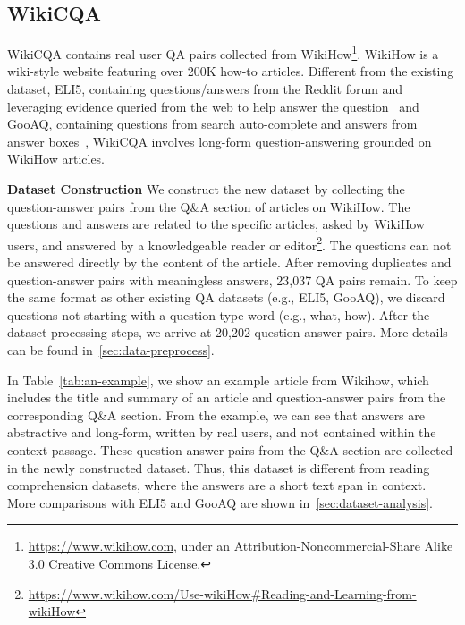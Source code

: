 \documentclass[11pt]{article}
\begin{document}
\subsection{WikiCQA}
\label{sec:dataset}

WikiCQA contains real user QA pairs collected from WikiHow\footnote{\url{https://www.wikihow.com}, under an Attribution-Noncommercial-Share Alike 3.0 Creative Commons License.}. WikiHow is a wiki-style website featuring over 200K how-to articles.  Different from the existing dataset, ELI5, containing questions/answers from the Reddit forum and leveraging evidence queried from the web to help answer the question~\cite{fan-etal-2019-eli5} and GooAQ, containing questions from search auto-complete and answers from answer boxes~\cite{khashabi-etal-2021-gooaq-open}, WikiCQA involves long-form question-answering grounded on WikiHow articles. 



\smallskip
\noindent \textbf{Dataset Construction} 
We construct the new dataset by collecting the question-answer pairs from the Q\&A section of articles on WikiHow.  
The questions and answers are related to the specific articles, asked by WikiHow users, and answered by a knowledgeable reader or editor\footnote{\url{https://www.wikihow.com/Use-wikiHow\#Reading-and-Learning-from-wikiHow}}. 
The questions can not be answered directly by the content of the article.
After removing duplicates and question-answer pairs with meaningless answers, 23,037 QA pairs remain. 
To keep the same format as other existing QA datasets (e.g., ELI5, GooAQ), we discard questions not starting with a question-type word (e.g., what, how). 
After the dataset processing steps, we arrive at 20,202 question-answer pairs. More details can be found in~\ref{sec:data-preprocess}.

In Table~\ref{tab:an-example}, we show an example article from Wikihow, which includes the title and summary of an article and question-answer pairs from the corresponding Q\&A section. From the example, we can see that answers are abstractive and long-form, written by real users, and not contained within the context passage. These question-answer pairs from the Q\&A section are collected in the newly constructed dataset. Thus, this dataset is different from reading comprehension datasets, where the answers are a short text span in context. More comparisons with ELI5 and GooAQ are shown in~\ref{sec:dataset-analysis}.
 
\end{document}
